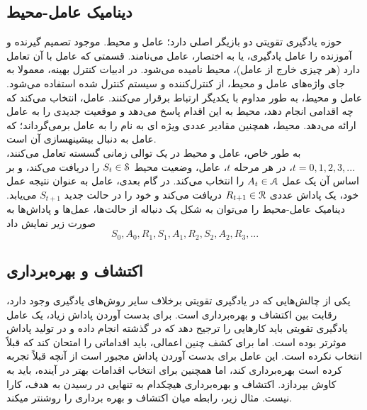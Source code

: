 \subsection{دینامیک عامل-محیط}
حوزه یادگیری تقویتی  دو بازیگر اصلی دارد؛ عامل و محیط. موجود تصمیم گیرنده و آموزنده را عامل یادگیری، یا به اختصار، عامل می‌نامند. قسمتی که عامل با آن تعامل دارد (هر چیزی خارج از عامل)، محیط نامیده می‌شود. در ادبیات کنترل بهینه، معمولا به جای واژه‌های عامل و محیط، از  کنترل‌کننده 
و سیستم کنترل شده  استفاده می‌شود.
عامل و محیط، به طور مداوم با یکدیگر ارتباط برقرار می‌کنند. عامل، انتخاب می‌کند که چه اقدامی‌ انجام دهد، محیط به این اقدام پاسخ می‌دهد و موقعیت جدیدی را به عامل ارائه می‌دهد.
محیط، همچنین مقادیر عددی ویژه ای به نام  را به عامل برمی‌گرداند؛ که عامل به دنبال بیشینه\nf سازی آن است.
\\به طور خاص، عامل و محیط در یک توالی زمانی گسسته تعامل می‌کنند، 
$t = 0,1,2,3,...$،
در هر مرحله $t$، عامل، وضعیت محیط  
$S_t \in \EuScript{S}$
را دریافت می‌کند، و بر اساس آن یک عمل 
$A_t \in \EuScript{A}$
را انتخاب می‌کند. در گام بعدی، عامل به عنوان نتیجه عمل خود، یک پاداش عددی $R_{t+1} \in \EuScript{R}$ دریافت می‌کند و خود را در حالت جدید $S_{t+1}$ می‌یابد.
دینامیک عامل-محیط را می‌توان به شکل یک دنباله از حالت‌ها، عمل‌ها و پاداش‌ها به صورت زیر نمایش داد \cite{suttonbook}
$$S_0, A_0, R_1, S_1, A_1, R_2, S_2, A_2, R_3,...$$

%
\subsection*{اکتشاف و بهره‌برداری}
یکی از چالش‌هایی که در یادگیری تقویتی برخلاف سایر روش‌های یادگیری وجود دارد، رقابت بین اکتشاف و بهره‌برداری است. برای بدست آوردن پاداش زیاد، یک عامل یادگیری تقویتی باید کارهایی را ترجیح دهد که در گذشته انجام داده و در تولید پاداش موثرتر بوده است. اما برای کشف چنین اعمالی، باید اقداماتی را امتحان کند که قبلاً انتخاب نکرده است. این عامل برای بدست آوردن پاداش مجبور است از آنچه قبلاً تجربه کرده است بهره‌برداری کند، اما همچنین برای انتخاب اقدامات بهتر در آینده، باید به کاوش بپردازد. 
اکتشاف و بهره‌برداری هیچکدام به تنهایی در رسیدن به هدف، کارا نیست. مثال زیر، رابطه میان اکتشاف و بهره برداری را روشن\nf تر می\nf کند.
